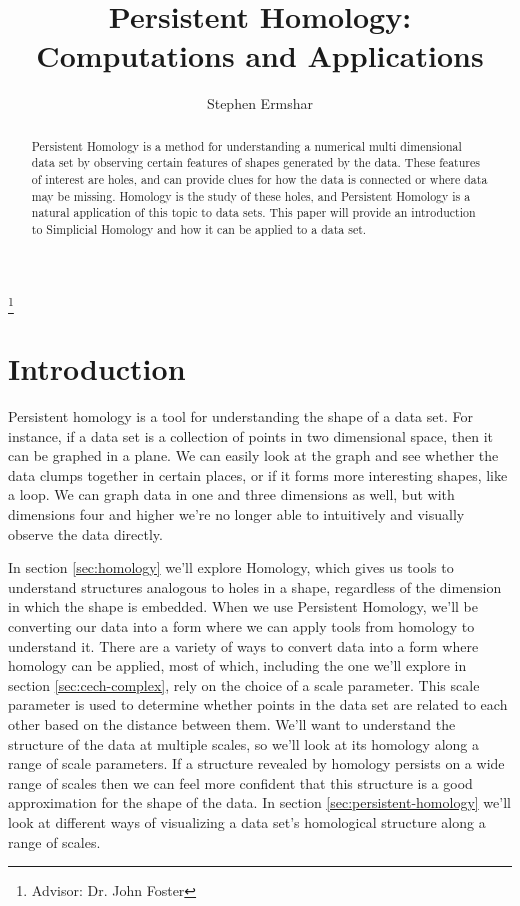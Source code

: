 

\title[Persistent Homology]{Persistent Homology: Computations and Applications}
\author{Stephen Ermshar}
\address{Department of Mathematics, Walla Walla University, College Place, WA 99324}
\thanks{Advisor: Dr. John Foster}

\date{} %



\begin{abstract}
    Persistent Homology is a method for understanding a numerical multi dimensional data set by observing certain features of shapes generated by the data.
    These features of interest are holes, and can provide clues for how the data is connected or where data may be missing.
    Homology is the study of these holes, and Persistent Homology is a natural application of this topic to data sets.
    This paper will provide an introduction to Simplicial Homology and how it can be applied to a data set.
\end{abstract}
\maketitle

\section{Introduction}

Persistent homology is a tool for understanding the shape of a data set.
For instance, if a data set is a collection of points in two dimensional space, then it can be graphed in a plane.
We can easily look at the graph and see whether the data clumps together in certain places, or if it forms more interesting shapes, like a loop.
We can graph data in one and three dimensions as well, but with dimensions four and higher we're no longer able to intuitively and visually observe the data directly.

In section \ref{sec:homology} we'll explore Homology, which gives us tools to understand structures analogous to holes in a shape, regardless of the dimension in which the shape is embedded.
When we use Persistent Homology, we'll be converting our data into a form where we can apply tools from homology to understand it.
There are a variety of ways to convert data into a form where homology can be applied, most of which, including the one we'll explore in section \ref{sec:cech-complex}, rely on the choice of a scale parameter.
This scale parameter is used to determine whether points in the data set are related to each other based on the distance between them.
We'll want to understand the structure of the data at multiple scales, so we'll look at its homology along a range of scale parameters.
If a structure revealed by homology persists on a wide range of scales then we can feel more confident that this structure is a good approximation for the shape of the data.
In section \ref{sec:persistent-homology} we'll look at different ways of visualizing a data set's homological structure along a range of scales.

